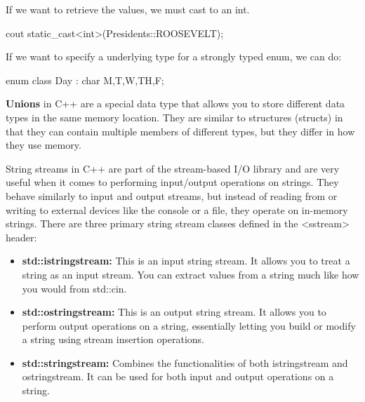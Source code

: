 \documentclass{report}
\begin{document}
    \bigbreak \noindent 
    If we want to retrieve the values, we must cast to an int.
    \bigbreak \noindent 
    
    \begin{cppcode}
cout static_cast<int>(Presidents::ROOSEVELT);
    \end{cppcode}
    
    \bigbreak \noindent 
    If we want to specify a underlying type for a strongly typed enum, we can do:
    \bigbreak \noindent 
    
    \begin{cppcode}
enum class Day : char {M,T,W,TH,F};
    \end{cppcode}

    \bigbreak \noindent 
    \begin{concept}
        \textbf{Unions} in C++ are a special data type that allows you to store different data types in the same memory location. They are similar to structures (structs) in that they can contain multiple members of different types, but they differ in how they use memory. 
    \end{concept}
    
    


    \pagebreak
    \bigbreak \noindent 
     String streams in C++ are part of the stream-based I/O library and are very useful when it comes to performing input/output operations on strings. They behave similarly to input and output streams, but instead of reading from or writing to external devices like the console or a file, they operate on in-memory strings.
     \bigbreak \noindent 
     There are three primary string stream classes defined in the <sstream> header:
     \begin{itemize}
         \item \textbf{std::istringstream:} This is an input string stream. It allows you to treat a string as an input stream. You can extract values from a string much like how you would from std::cin.
         \item \textbf{std::ostringstream:} This is an output string stream. It allows you to perform output operations on a string, essentially letting you build or modify a string using stream insertion operations.
         \item \textbf{std::stringstream:} Combines the functionalities of both istringstream and ostringstream. It can be used for both input and output operations on a string.
     \end{itemize}
\end{document}
